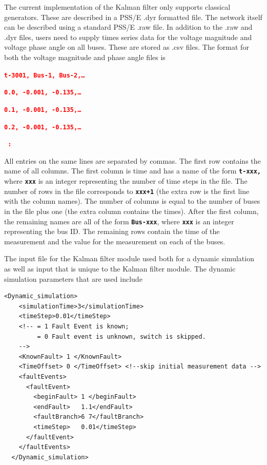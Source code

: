 \documentclass[12pt]{report} %
\begin{document}
The current implementation of the Kalman filter only supports classical generators. These are described in a PSS/E .dyr formatted file. The network itself can be described using a standard PSS/E .raw file. In addition to the .raw and .dyr files, users need to supply times series data for the voltage magnitude and voltage phase angle on all buses. These are stored as .csv files. The format for both the voltage magnitude and phase angle files is

\textcolor{red}{\texttt{\textbf{t-3001,  Bus-1,  Bus-2,{\dots}}}}

\textcolor{red}{\texttt{\textbf{0.0,    -0.001, -0.135,{\dots}}}}

\textcolor{red}{\texttt{\textbf{0.1,    -0.001, -0.135,{\dots}}}}

\textcolor{red}{\texttt{\textbf{0.2,    -0.001, -0.135,{\dots}}}}

\textcolor{red}{\texttt{\textbf{ :}}}

All entries on the same lines are separated by commas. The first row contains the name of all columns. The first column is time and has a name of the form \texttt{\textbf{t-xxx,}} where \texttt{\textbf{xxx}} is an integer representing the number of time steps in the file. The number of rows in the file corresponds to \texttt{\textbf{xxx+1}} (the extra row is the first line with the column names). The number of columns is equal to the number of buses in the file plus one (the extra column contains the times). After the first column, the remaining names are all of the form \texttt{\textbf{Bus-xxx}}, where \texttt{\textbf{xxx}} is an integer representing the bus ID. The remaining rows contain the time of the measurement and the value for the measurement on each of the buses.

The input file for the Kalman filter module used both for a dynamic simulation as well as input that is unique to the Kalman filter module. The dynamic simulation parameters that are used include

{
\color{red}
\begin{Verbatim}[fontseries=b]
  <Dynamic_simulation>
    <simulationTime>3</simulationTime>
    <timeStep>0.01</timeStep>
    <!-- = 1 Fault Event is known; 
         = 0 Fault event is unknown, switch is skipped. 
    -->
    <KnownFault> 1 </KnownFault>
    <TimeOffset> 0 </TimeOffset> <!--skip initial measurement data -->
    <faultEvents>
      <faultEvent>
        <beginFault> 1 </beginFault>
        <endFault>   1.1</endFault>
        <faultBranch>6 7</faultBranch>
        <timeStep>   0.01</timeStep>
      </faultEvent>
    </faultEvents>
  </Dynamic_simulation>
\end{Verbatim}
}
\end{document}
